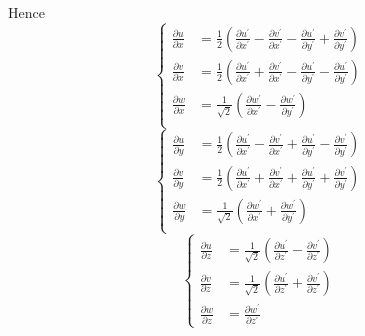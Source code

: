 \documentclass[12pt,a4]{ctexart}
\begin{document}
Hence
\begin{equation}
   \begin{cases}
	  \frac{\partial u}{\partial x} & =\frac{1}{2}\left(\frac{\partial u^{\prime}}{\partial x^{\prime}}-\frac{\partial v^{\prime}}{\partial x^{\prime}}-\frac{\partial u^{\prime}}{\partial y^{\prime}}+\frac{\partial v^{\prime}}{\partial y^{\prime}}\right) \\
	  \frac{\partial v}{\partial x} & =\frac{1}{2}\left(\frac{\partial u^{\prime}}{\partial x^{\prime}}+\frac{\partial v^{\prime}}{\partial x^{\prime}}-\frac{\partial u^{\prime}}{\partial y^{\prime}}-\frac{\partial u^{\prime}}{\partial y^{\prime}}\right) \\
	  \frac{\partial w}{\partial x} & =\frac{1}{\sqrt{2}}\left(\frac{\partial w^{\prime}}{\partial x^{\prime}}-\frac{\partial w^{\prime}}{\partial y^{\prime}}\right)                                                                                          \\
   \end{cases}
\end{equation}
\begin{equation}
   \begin{cases}
	  \frac{\partial u}{\partial y} & =\frac{1}{2}\left(\frac{\partial u^{\prime}}{\partial x^{\prime}}-\frac{\partial v^{\prime}}{\partial x^{\prime}}+\frac{\partial u^{\prime}}{\partial y^{\prime}}-\frac{\partial v^{\prime}}{\partial y^{\prime}}\right) \\
	  \frac{\partial v}{\partial y} & =\frac{1}{2}\left(\frac{\partial u^{\prime}}{\partial x^{\prime}}+\frac{\partial v^{\prime}}{\partial x^{\prime}}+\frac{\partial u^{\prime}}{\partial y^{\prime}}+\frac{\partial v^{\prime}}{\partial y^{\prime}}\right) \\
	  \frac{\partial w}{\partial y} & =\frac{1}{\sqrt{2}}\left(\frac{\partial w^{\prime}}{\partial x^{\prime}}+\frac{\partial w^{\prime}}{\partial y^{\prime}}\right)                                                                                          \\
   \end{cases}
\end{equation}
\begin{equation}
   \begin{cases}
	  \frac{\partial u}{\partial z} & =\frac{1}{\sqrt{2}}\left(\frac{\partial u^{\prime}}{\partial z^{\prime}}-\frac{\partial v^{\prime}}{\partial z^{\prime}}\right) \\
	  \frac{\partial v}{\partial z} & =\frac{1}{\sqrt{2}}\left(\frac{\partial u^{\prime}}{\partial z^{\prime}}+\frac{\partial v^{\prime}}{\partial z^{\prime}}\right) \\
	  \frac{\partial w}{\partial z} & =\frac{\partial w^{\prime}}{\partial z^{\prime}}
   \end{cases}
\end{equation}
\end{document}
